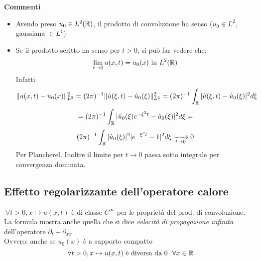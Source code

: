 \textbf{Commenti} 
\begin{itemize}
	\item Avendo preso $u_0 \in L^{2}(\mathbb{R})$, il prodotto di convoluzione ha senso ($u_0\in L^2,$ gaussiana $\in L^1$)
	\item Se il prodotto scritto  ha senso per $t>0$, si può far vedere che:
		\[\lim_{t \to 0} u(x,t)=u_0(x)\text{ in }L^{2}(\mathbb{R})\]
		Infatti
		\[ \|u(x,t)-u_0(x)\|^2_{L^2}=(2\pi)^{-1} \|\hat{u}(\xi,t)-\hat{u}_0(\xi)\|^2_{L^2}=(2\pi)^{-1} \int_{\mathbb{R}}^{} |\hat{u}(\xi, t)-\hat{u}_0(\xi)|^2d\xi\]
		\[=(2\pi)^{-1}\int_{\mathbb{R}}^{} |\hat{u}_0(\xi) e^{-\xi^2 t}-\hat{u}_0(\xi)|^2d\xi=\]
		\[(2\pi)^{-1}\int_{\mathbb{R}}^{} |\hat{u}_0(\xi)|^2 |e^{-\xi^2 t}-1|^2d\xi \xrightarrow[t\to 0]{}0\]
		Per Plancherel. Inoltre il limite per $t\to 0$ passa sotto integrale per convergenza dominata.
\end{itemize}
\subsection{Effetto regolarizzante dell'operatore calore}
$\ \forall t>0,x\mapsto u(x,t)$ è di classe $C^\infty$ per le proprietà del prod. di convoluzione.
\\La formula mostra anche quella che si dice \emph{velocità di propagazione infinita} dell'operatore $\partial_t-\partial_{x x}$ 
\\Ovvero: anche se $u_0(x)$ è a supporto compatto 
\[\ \forall t>0,x\mapsto u(x,t)\text{ è diversa da 0 }\ \forall x\in \mathbb{R}\]
